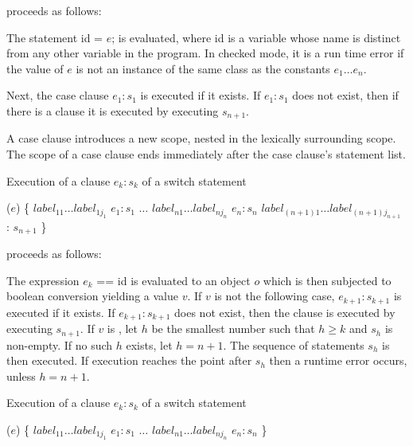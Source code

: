 \documentclass{article}
\newcommand{\code}[1]{{\sf #1}}
\begin{document}
proceeds as follows:

\LMHash{}
The statement \code{\VAR{} id = $e$;} is evaluated, where \code{id} is a variable whose name is distinct from any other variable in the program. In checked mode, it is a run time error if the value of $e$ is not an instance of the same class as the constants $e_1 \ldots e_n$. 


\LMHash{}
Next, the case clause \CASE{} $e_{1}: s_{1}$ is executed if it exists. If \CASE{} $e_{1}: s_{1}$ does not exist, then if there is a  \DEFAULT{} clause it is executed by executing $s_{n+1}$.

\LMHash{}
A case clause introduces a new scope, nested in the lexically surrounding scope. The scope of a case clause ends immediately after the case clause's statement list.

\LMHash{}
Execution of a \CASE{} clause \CASE{} $e_{k}: s_{k}$ of a  switch statement  

\begin{dartCode}
\SWITCH{} ($e$) \{
   $label_{11} \ldots label_{1j_1}$ \CASE{} $e_1: s_1$
   $\ldots$
   $label_{n1} \ldots label_{nj_n}$ \CASE{} $e_n: s_n$
   $label_{(n+1)1} \ldots label_{(n+1)j_{n+1}}$ \DEFAULT{}: $s_{n+1}$
\}
\end{dartCode}

proceeds as follows:

\LMHash{}
The expression \code{$e_k$ == id} is evaluated to an object $o$ which is then subjected to boolean conversion yielding a value $v$. 
If $v$ is not  \TRUE{} the following case,  \CASE{} $e_{k+1}: s_{k+1}$ is executed if it exists. If  \CASE{} $e_{k+1}: s_{k+1}$ does not exist, then the \DEFAULT{} clause is executed by executing $s_{n+1}$.
If $v$ is \TRUE{},   let $h$ be the smallest number such that $h \ge k$ and $s_h$ is non-empty. If no such $h$ exists, let $h = n + 1$. The  sequence of statements $s_h$ is then executed.
If execution reaches the point after $s_h$  then  a runtime error occurs, unless $h = n+1$.

\LMHash{}
Execution of a \CASE{} clause \CASE{} $e_{k}: s_{k}$ of a  switch statement  

\begin{dartCode}
\SWITCH{} ($e$) \{
   $label_{11} \ldots label_{1j_1}$ \CASE{} $e_1: s_1$
   $\ldots$
   $label_{n1} \ldots label_{nj_n}$ \CASE{} $e_n: s_n$
\}
\end{dartCode}
\end{document}
